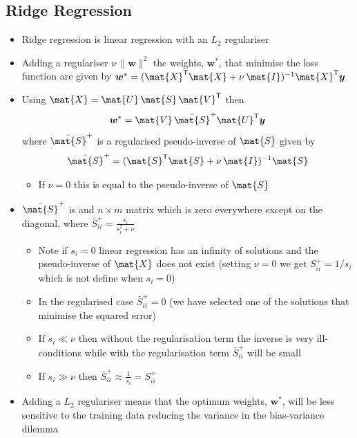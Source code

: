 \documentclass[11pt]{article}
\newcommand{\tr}{\textsf{T}}
\begin{document}
\subsection{Ridge Regression}
\label{sec:org6d7a8b5}
\begin{itemize}
\item Ridge regression is linear regression with an \(L_2\) regulariser
\item Adding a regulariser \(\nu\, \|\bm{w}\|^2\) the weights, \(\bm{w}^*\), that
minimise the loss function are given by \(\bm{w}^* =
     (\mat{X}^\tr\mat{X}+\nu\,\mat{I})^{-1}\mat{X}^\tr \bm{y}\)
\item Using \(\mat{X} = \mat{U}\,\mat{S}\,\mat{V}^\tr\) then
\begin{align*}
\bm{w}^* = \mat{V}\,\bar{\mat{S}}^+ \mat{U}^\tr \bm{y}
\end{align*}
where \(\bar{\mat{S}}^+\) is a regularised pseudo-inverse of \(\mat{S}\) given by
\begin{align*}
\bar{\mat{S}}^+ = (\mat{S}^\tr\mat{S}+\nu\,\mat{I})^{-1}\mat{S}
\end{align*}
\begin{itemize}
\item If \(\nu=0\) this is equal to the pseudo-inverse of \(\mat{S}\)
\end{itemize}
\item \(\bar{\mat{S}}^+\) is and \(n\times m\) matrix which is zero
everywhere except on the diagonal, where \(\bar{S}^+_{ii} = \frac{s_i}{s_i^2+\nu}\)
\begin{itemize}
\item Note if \(s_i=0\) linear regression has an infinity of solutions
and the pseudo-inverse of \(\mat{X}\) does not exist (setting
\(\nu=0\) we get \(S^+_{ii}=1/s_i\) which is not define when \(s_i=0\))
\item In the regularised case \(\bar{S}^+_{ii} = 0\) (we have selected
one of the solutions that minimise the squared error)
\item If \(s_i\ll\nu\) then without the regularisation term the inverse is
very ill-conditions while with the regularisation term
\(\bar{S}^+_{ii}\) will be small
\item If \(s_i\gg\nu\) then \(\bar{S}^+_{ii} \approx \frac{1}{s_i} = S^+_{ii}\)
\end{itemize}
\item Adding a \(L_2\) regulariser means that the optimum weights,
\(\bm{w}^*\), will be less sensitive to the training data reducing
the variance in the bias-variance dilemma
\end{itemize}
\end{document}
